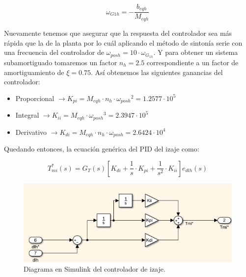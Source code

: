 \documentclass[11pt]{article}
\begin{document}
\begin{equation}
	\label{eq:sistema_izaje_simplificado_laplace_polos}
	\omega_{G1h}=-\frac{b_{eqh}}{M_{eqh}}
\end{equation}

Nuevamente tenemos que asegurar que la respuesta del controlador sea más rápida que la de la planta por lo cuál aplicando el método de sintonía serie con una frecuencia del controlador de $\omega_{posh}=10\cdot \omega_{G_{1h}}$. Y para obtener un sistema subamortiguado tomaremos un factor $n_{h}=2.5$ correspondiente a un factor de amortiguamiento de $\xi =0.75$. Así obtenemos las siguientes ganancias del controlador:

\begin{itemize}
	\item Proporcional $\rightarrow K_{pi} = M_{eqh}\cdot n_{h}\cdot {\omega_{posh}}^{2} = 1.2577 \cdot 10^5$
	\item Integral $\rightarrow K_{ii} = M_{eqh}\cdot {\omega_{posh}}^{3}  = 2.3947 \cdot 10^5$
	\item Derivativo $\rightarrow K_{di} = M_{eqh}\cdot n_{h}\cdot {\omega_{posh}} = 2.6424\cdot 10^4$
\end{itemize}

Quedando entonces, la ecuación genérica del PID del izaje como:

\begin{equation}
	\label{eq:sistema_izaje_simplificado_laplace_controlador}
	T_{mi}^{*}(s)=G_{T}(s)\left [ K_{di}+\frac{1}{s}\cdot K_{pi}+\frac{1}{s^{2}}\cdot K_{ii} \right ] e_{dlh}(s)
\end{equation}

\begin{figure}[h!]
	\centering
	\includegraphics[width=1\textwidth]{images/imagen_13_controlador_izaje.png}
	\caption{Diagrama en Simulink del controlador de izaje.}
	\label{fig:controlador_izaje_simulink}
\end{figure}

\newpage
\end{document}
